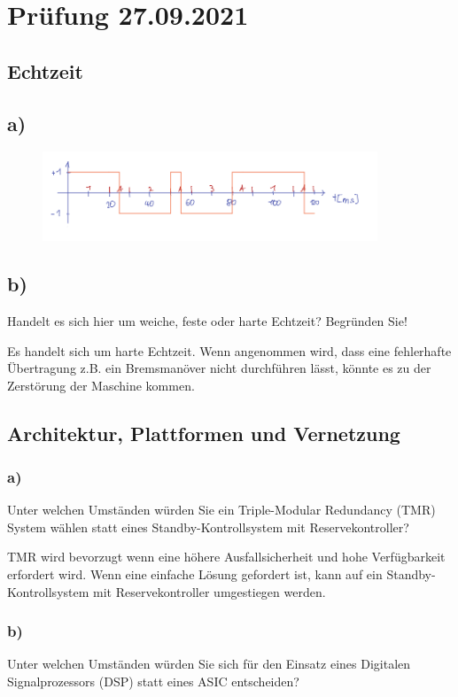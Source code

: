 \section{Prüfung 27.09.2021}
\subsection{Echtzeit}
\subsection{a)}

\begin{figure}[H]
  \includegraphics[width=10cm]{images/KA270921/1a.PNG}
  \centering
\end{figure}

\subsection{b)}
Handelt es sich hier um weiche, feste oder harte Echtzeit? Begründen Sie!

Es handelt sich um harte Echtzeit. Wenn angenommen wird, dass eine fehlerhafte Übertragung z.B. ein Bremsmanöver
nicht durchführen lässt, könnte es zu der Zerstörung der Maschine kommen.

\subsection{Architektur, Plattformen und Vernetzung}
\subsubsection{a)}
Unter welchen Umständen würden Sie ein Triple-Modular Redundancy (TMR) System wählen statt
eines Standby-Kontrollsystem mit Reservekontroller?

TMR wird bevorzugt wenn eine höhere Ausfallsicherheit und hohe Verfügbarkeit erfordert wird.
Wenn eine einfache Lösung gefordert ist, kann auf ein Standby-Kontrollsystem mit Reservekontroller
umgestiegen werden.

\subsubsection{b)}
Unter welchen Umständen würden Sie sich für den Einsatz eines Digitalen Signalprozessors (DSP) statt
eines ASIC entscheiden?

